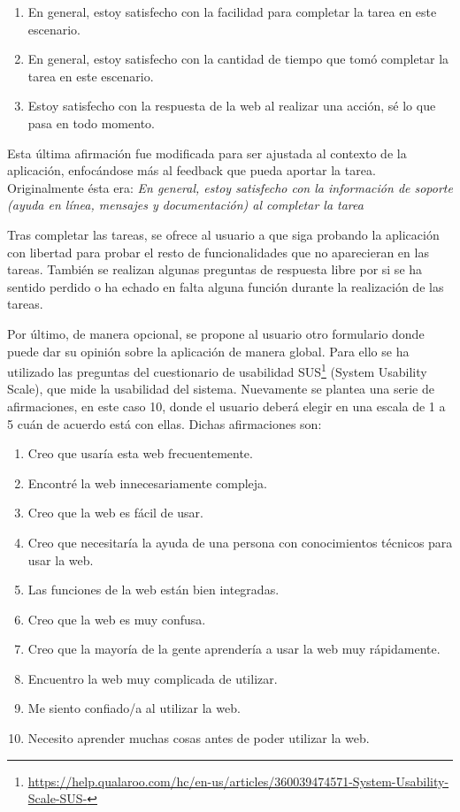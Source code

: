 \begin{enumerate}
	\item En general, estoy satisfecho con la facilidad para completar la tarea en este escenario.
	\item En general, estoy satisfecho con la cantidad de tiempo que tomó completar la tarea en este escenario.
	\item Estoy satisfecho con la respuesta de la web al realizar una acción, sé lo que pasa en todo momento.
\end{enumerate}

Esta última afirmación fue modificada para ser ajustada al contexto de la aplicación, enfocándose más al feedback que pueda aportar la tarea. Originalmente ésta era:  \textit{En general, estoy satisfecho con la información de soporte (ayuda en línea, mensajes y documentación) al completar la tarea}

Tras completar las tareas, se ofrece al usuario a que siga probando la aplicación con libertad para probar el resto de funcionalidades que no aparecieran en las tareas.  
También se realizan algunas preguntas de respuesta libre por si se ha sentido perdido o ha echado en falta alguna función durante la realización de las tareas.  

Por último, de manera opcional, se propone al usuario otro formulario donde puede dar su opinión sobre la aplicación de manera global. Para ello se ha utilizado las preguntas del cuestionario de usabilidad  SUS\footnote{\url{https://help.qualaroo.com/hc/en-us/articles/360039474571-System-Usability-Scale-SUS-}} (System Usability Scale), que mide la usabilidad del sistema. Nuevamente se plantea una serie de afirmaciones, en este caso 10, donde el usuario deberá elegir en una escala de 1 a 5 cuán de acuerdo está con ellas. Dichas afirmaciones son: 


\begin{enumerate}
		\item Creo que usaría esta web frecuentemente.
	\item Encontré la web innecesariamente compleja.
	\item Creo que la web es fácil de usar.
	\item Creo que necesitaría la ayuda de una persona con conocimientos técnicos para usar la web.
	\item Las funciones de la web están bien integradas.
	\item Creo que la web es muy confusa.
	\item Creo que la mayoría de la gente aprendería a usar la web muy rápidamente.
	\item Encuentro la web muy complicada de utilizar.
	\item Me siento confiado/a al utilizar la web.
	\item Necesito aprender muchas cosas antes de poder utilizar la web.
\end{enumerate}

